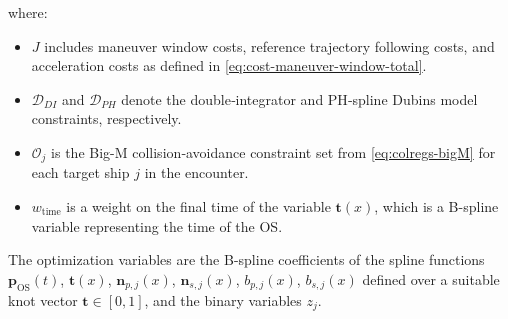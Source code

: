 where:
\begin{itemize}
    \item $J$ includes maneuver window costs, reference trajectory following costs, and acceleration costs as defined in \cref{eq:cost-maneuver-window-total}.
    \item $\mathcal{D}_{DI}$ and $\mathcal{D}_{PH}$ denote the double‐integrator and PH‐spline Dubins model constraints, respectively.
    \item $\mathcal{O}_j$ is the Big-M collision‐avoidance constraint set from \eqref{eq:colregs-bigM} for each target ship $j$ in the encounter.
    \item $w_\text{time}$ is a weight on the final time of the variable $\mathbf t(x)$, which is a B-spline variable representing the time of the OS.
\end{itemize}
The optimization variables are the B-spline coefficients of the spline functions
$\mathbf{p}_\text{OS}(t)$, $\mathbf t(x)$, $\mathbf{n}_{p,j}(x)$, $\mathbf{n}_{s,j}(x)$, $b_{p,j}(x)$, $b_{s,j}(x)$ defined over a suitable knot vector $\mathbf{t}\in[0,1]$, and the binary variables $z_j$.